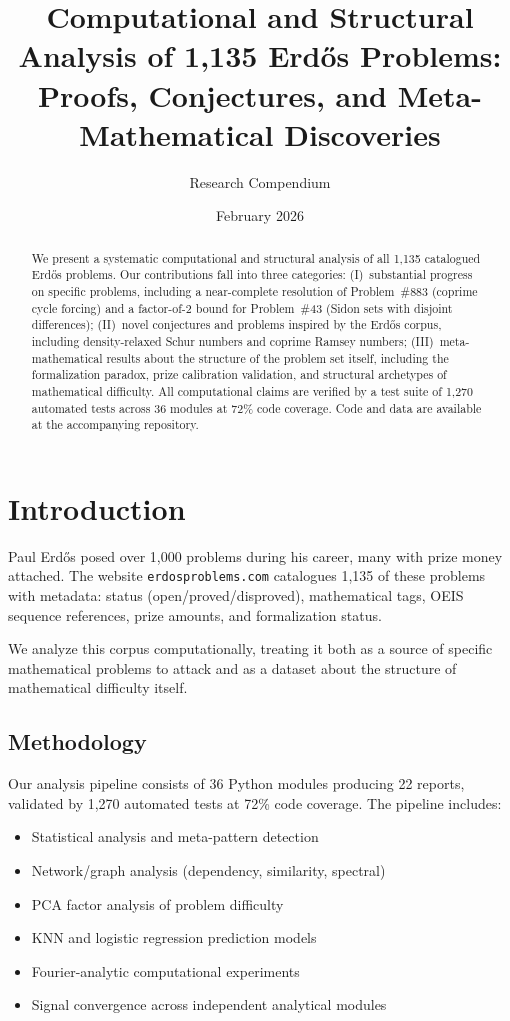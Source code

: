 \documentclass[11pt,a4paper]{article}
\title{Computational and Structural Analysis of 1,135 Erd\H{o}s Problems:\\
Proofs, Conjectures, and Meta-Mathematical Discoveries}
\author{Research Compendium}
\date{February 2026}
\theoremstyle{definition}
\theoremstyle{remark}
\begin{document}
\maketitle

\begin{abstract}
We present a systematic computational and structural analysis of all 1,135
catalogued Erd\H{o}s problems. Our contributions fall into three categories:
(I)~substantial progress on specific problems, including a near-complete
resolution of Problem~\#883 (coprime cycle forcing) and a factor-of-2 bound
for Problem~\#43 (Sidon sets with disjoint differences);
(II)~novel conjectures and problems inspired by the Erd\H{o}s corpus, including
density-relaxed Schur numbers and coprime Ramsey numbers;
(III)~meta-mathematical results about the structure of the problem set itself,
including the formalization paradox, prize calibration validation, and
structural archetypes of mathematical difficulty.
All computational claims are verified by a test suite of 1,270 automated tests
across 36 modules at 72\% code coverage.
Code and data are available at the accompanying repository.
\end{abstract}

\tableofcontents
\newpage

\section{Introduction}

Paul Erd\H{o}s posed over 1,000 problems during his career, many with prize
money attached. The website \texttt{erdosproblems.com} catalogues 1,135 of these
problems with metadata: status (open/proved/disproved), mathematical tags,
OEIS sequence references, prize amounts, and formalization status.

We analyze this corpus computationally, treating it both as a source of
specific mathematical problems to attack and as a dataset about the structure
of mathematical difficulty itself.

\subsection{Methodology}

Our analysis pipeline consists of 36 Python modules producing 22 reports,
validated by 1,270 automated tests at 72\% code coverage.
The pipeline includes:
\begin{itemize}[nosep]
\item Statistical analysis and meta-pattern detection
\item Network/graph analysis (dependency, similarity, spectral)
\item PCA factor analysis of problem difficulty
\item KNN and logistic regression prediction models
\item Fourier-analytic computational experiments
\item Signal convergence across independent analytical modules
\end{itemize}
\end{document}

